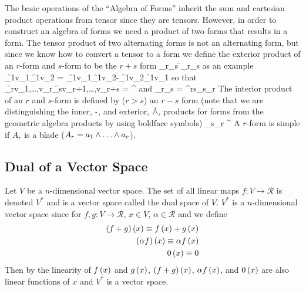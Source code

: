 The basic operations of the ``Algebra of Forms'' inherit the sum and cartesian product operations from tensor since they are tensors.  However, 
in order to construct an algebra of forms we need a product of two forms that results in a form.  The tensor product of two alternating forms is
not an alternating form, but since we know how to convert a tensor to a form we define the exterior product of an $r$-form and $s$-form to be 
the $r+s$ form
\be\label{eq5_158}
	\alpha_{r}\Wbld \beta_{s} \equiv \f{\epsilon}{\alpha_{r}\otimes\beta_{s}}
\ee
as an example
\be
	\f{\alpha_{1}}{v_{1}}\Wbld\f{\beta_{1}}{v_{2}} = \f{\alpha_{1}}{v_{1}}\f{\beta_{1}}{v_{2}}-\f{\alpha_{1}}{v_{2}}\f{\beta_{1}}{v_{1}}
\ee
so that
\be
\f{\alpha_{r}}{v_{1},\dots,v_{r}}\Wbld\f{\beta_{s}}{v_{r+1},\dots,v_{r+s}} = ^{\R}\cdot{}
\ee
and
\be
	\alpha_{r}\Wbld\beta_{s} = ^{rs}\beta_{s}\Wbld\alpha_{r}
\ee
The interior product of an $r$ and $s$-form is defined by ($r > s$) an $r-s$ form (note that we are distinguishing the inner, $\boldsymbol{\cdot}$, and
exterior, $\hat{\wedge}$, products for forms from the geometric algebra products by using boldface symbols)
\be
\beta_{s}\cdotbld\alpha_{r} \equiv {}^{\R}\cdot{}
\ee
A $r$-form is simple if $A_{r}$ is a blade ($A_{r} = a_{1}\W\dots\W a_{r}$).

\subsection{Dual of a Vector Space}
Let $V$ be a $n$-dimensional vector space.  The set of all linear maps $f:V\rightarrow \mathcal{R}$ is denoted $V^{*}$ and is a vector space called the
dual space of $V$. $V^{*}$ is a $n$-dimensional vector space since for $f,g:V\rightarrow \mathcal{R}$, $x \in V$, $\alpha \in \mathcal{R}$ and we define
\begin{align}
	{\left ({f+g} \right )}\left ( {x} \right ) \equiv {f}\left ( {x} \right ) +{g}\left ( {x} \right ) \\
	{\left ( {\alpha f} \right )}\left ( {x} \right ) \equiv \alpha{f}\left ( {x} \right ) \\
	{0}\left ( {x} \right ) \equiv 0
\end{align}
Then by the linearity of ${f}\left ( {x} \right )$ and ${g}\left ( {x} \right )$, ${\left ( {f+g} \right )}\left ( {x} \right )$, ${\alpha f}\left ( {x} \right )$, and ${0}\left ( {x} \right )$ are also linear functions of $x$ and $V^{*}$ is
a vector space.

